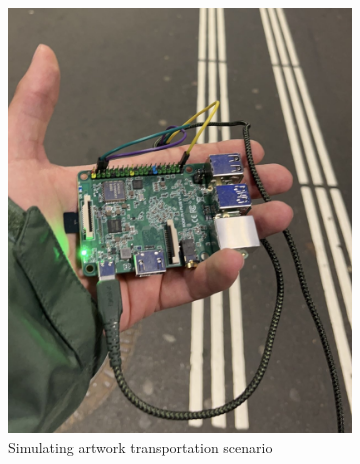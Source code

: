 \begin{figure}[ht]
    \begin{subfigure}{0.5\textwidth}
        \centering
        \includegraphics[height=0.25\textheight]{resources/field_test.jpeg}
        \caption{Simulating artwork transportation scenario}
        \label{fig:sensor_transport}
    \end{subfigure}
    \hfill
    \begin{subfigure}{0.5\textwidth}
        \centering 

\end{subfigure}
\end{figure}
